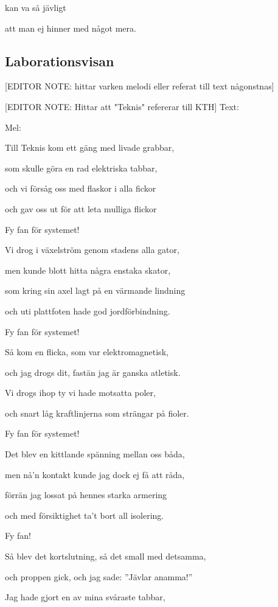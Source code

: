 kan va så jävligt

att man ej hinner med något mera.\bigskip

\subsection{\textbf{Laborationsvisan}}

[EDITOR NOTE: hittar varken melodi eller referat till text någonstnas]

[EDITOR NOTE: Hittar att "Teknis" refererar till KTH]
Text: 

Mel: \bigskip

Till Teknis kom ett gäng med livade grabbar,

som skulle göra en rad elektriska tabbar,

och vi försåg oss med flaskor i alla fickor

och gav oss ut för att leta mulliga flickor\bigskip

Fy fan för systemet!\bigskip

Vi drog i växelström genom stadens alla gator,

men kunde blott hitta några enstaka skator,

som kring sin axel lagt på en värmande lindning

och uti plattfoten hade god jordförbindning. \bigskip

Fy fan för systemet!\bigskip

Så kom en flicka, som var elektromagnetisk,

och jag drogs dit, fastän jag är ganska atletisk.

Vi drogs ihop ty vi hade motsatta poler,

och snart låg kraftlinjerna som strängar på fioler.\bigskip

Fy fan för systemet! \bigskip

Det blev en kittlande spänning mellan oss båda,

men nå’n kontakt kunde jag dock ej få att råda,

förrän jag lossat på hennes starka armering

och med försiktighet ta’t bort all isolering. \bigskip

Fy fan!

Så blev det kortslutning, så det small med detsamma,

och proppen gick, och jag sade: ”Jävlar anamma!”

Jag hade gjort en av mina svåraste tabbar,

